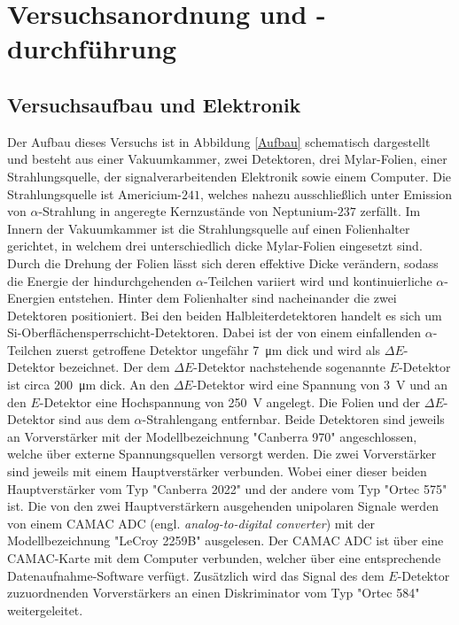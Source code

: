 \section{Versuchsanordnung und -durchführung}

\subsection{Versuchsaufbau und Elektronik} \label{AufbauElektronik}

Der Aufbau dieses Versuchs ist in Abbildung \ref{Aufbau} schematisch dargestellt und besteht aus einer Vakuumkammer, zwei Detektoren, drei Mylar-Folien, einer Strahlungsquelle, der signalverarbeitenden Elektronik sowie einem Computer.
\noindent Die Strahlungsquelle ist Americium-$241$, welches nahezu ausschließlich unter Emission von $\alpha$-Strahlung in angeregte Kernzustände von Neptunium-$237$ zerfällt.
Im Innern der Vakuumkammer ist die Strahlungsquelle auf einen Folienhalter gerichtet, in welchem drei unterschiedlich dicke Mylar-Folien eingesetzt sind.
Durch die Drehung der Folien lässt sich deren effektive Dicke verändern, sodass die Energie der hindurchgehenden $\alpha$-Teilchen variiert wird und kontinuierliche $\alpha$-Energien entstehen.
Hinter dem Folienhalter sind nacheinander die zwei Detektoren positioniert.
Bei den beiden Halbleiterdetektoren handelt es sich um Si-Oberflächensperrschicht-Detektoren.
Dabei ist der von einem einfallenden $\alpha$-Teilchen zuerst getroffene Detektor ungefähr \SI{7}{\micro\meter} dick und wird als $\Delta E$-Detektor bezeichnet.
Der dem $\Delta E$-Detektor nachstehende sogenannte $E$-Detektor ist circa \SI{200}{\micro\meter} dick.
An den $\Delta E$-Detektor wird eine Spannung von \SI{3}{\volt} und an den $E$-Detektor eine Hochspannung von \SI{250}{\volt} angelegt.
Die Folien und der $\Delta E$-Detektor sind aus dem $\alpha$-Strahlengang entfernbar.
Beide Detektoren sind jeweils an Vorverstärker mit der Modellbezeichnung "Canberra 970" angeschlossen, welche über externe Spannungsquellen versorgt werden.
Die zwei Vorverstärker sind jeweils mit einem Hauptverstärker verbunden.
Wobei einer dieser beiden Hauptverstärker vom Typ "Canberra 2022" und der andere vom Typ "Ortec 575" ist.
Die von den zwei Hauptverstärkern ausgehenden unipolaren Signale werden von einem CAMAC ADC (engl. \emph{analog-to-digital converter}) mit der Modellbezeichnung "LeCroy 2259B" ausgelesen.
Der CAMAC ADC ist über eine CAMAC-Karte mit dem Computer verbunden, welcher über eine entsprechende Datenaufnahme-Software verfügt.
Zusätzlich wird das Signal des dem $E$-Detektor zuzuordnenden Vorverstärkers an einen Diskriminator vom Typ "Ortec 584" weitergeleitet.
